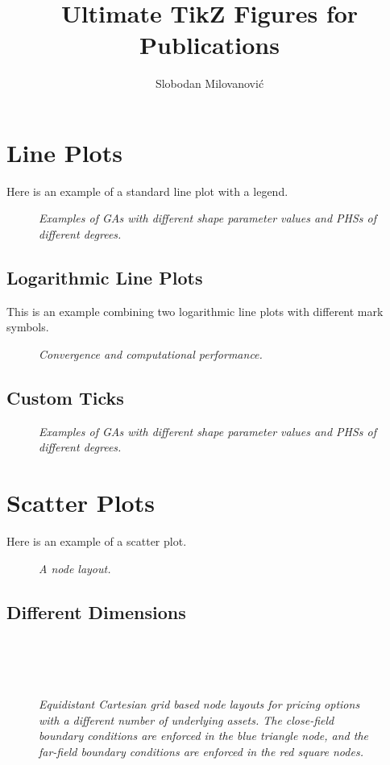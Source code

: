 \documentclass[11pt, oneside]{article}   	%
\title{Ultimate TikZ Figures for Publications}
\author{Slobodan Milovanovi\'c}
\begin{document}
\maketitle
%
%
%
\section{Line Plots}
Here is an example of a standard line plot with a legend.
%
\begin{figure}[H]
\centering

\caption{\emph{Examples of GAs with different shape parameter values and PHSs of different degrees.}}
\label{fig:RBF}
\end{figure}
%
%
\subsection{Logarithmic Line Plots}
This is an example combining two logarithmic line plots with different mark symbols.
\begin{figure}[H]
\centering


\caption{\emph{Convergence and computational performance.}}
\label{fig:log}
\end{figure}
%
\subsection{Custom Ticks}
%
\begin{figure}[H]
\centering

\caption{\emph{Examples of GAs with different shape parameter values and PHSs of different degrees.}}
\label{fig:payoff}
\end{figure}
%
%
%
\newpage
\section{Scatter Plots}
Here is an example of a scatter plot.
\begin{figure}[H]
\centering

\caption{\emph{A node layout.}}
\label{fig:stencils}
\end{figure}

\subsection{Different Dimensions}
\begin{figure}[H]
\centering
\\
\vspace{11pt}
\\
\vspace{11pt}
\\
\caption{\emph{Equidistant Cartesian grid based node layouts for pricing options with a different number of underlying assets. The close-field boundary conditions are enforced in the blue triangle node, and the far-field boundary conditions are enforced in the red square nodes.}}
\label{fig:gridreg}
\end{figure}
\end{document}
